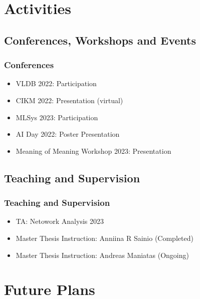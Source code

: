 \documentclass[pdf]{beamer}
\begin{document}
\section{Activities}

\subsection{Conferences, Workshops and Events}
\begin{frame}
    \frametitle{Conferences}
    \begin{itemize}
        \item VLDB 2022: Participation
        \item CIKM 2022: Presentation (virtual)
        \item MLSys 2023: Participation
        \item AI Day 2022: Poster Presentation
        \item Meaning of Meaning Workshop 2023: Presentation
    \end{itemize}

    
\end{frame}

\subsection{Teaching and Supervision}
\begin{frame}
    \frametitle{Teaching and Supervision}

    \begin{itemize}
        \item  TA: Netowork Analysis 2023
        \item Master Thesis Instruction: Anniina R Sainio (Completed)
        \item Master Thesis Instruction: Andreas Maniatas (Ongoing)
    \end{itemize}
\end{frame}

\section{Future Plans}
\end{document}
